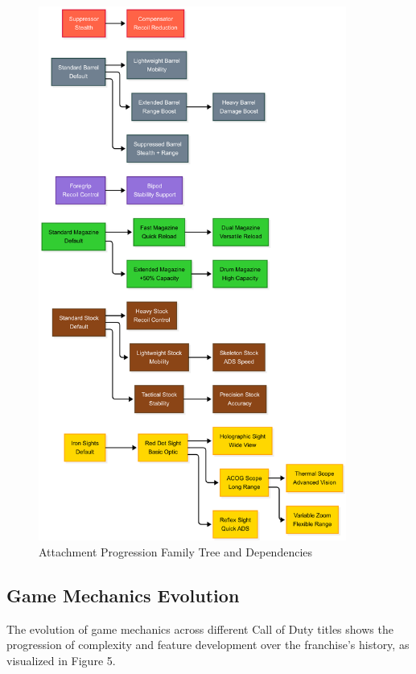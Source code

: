 \documentclass[12pt,a4paper]{article}
\begin{document}
\begin{figure}[H]
    \centering
    \includegraphics[width=0.9\textwidth]{../diagrams/attachment-progression-family-tree-vertical.png}
    \caption{Attachment Progression Family Tree and Dependencies}
\end{figure}

\subsection{Game Mechanics Evolution}

The evolution of game mechanics across different Call of Duty titles shows the progression of complexity and feature development over the franchise's history, as visualized in Figure 5.
\end{document}
